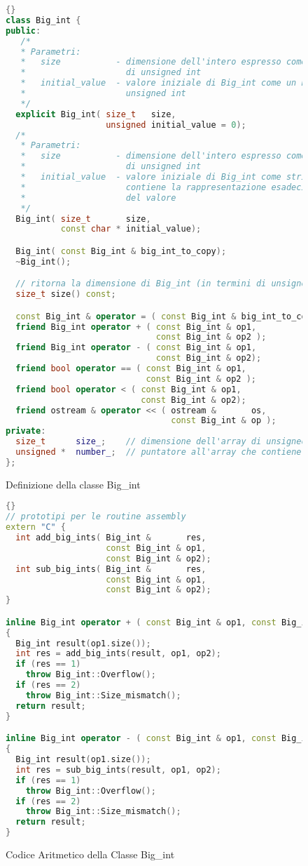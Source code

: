 \begin{figure}[tp]
\begin{lstlisting}[frame=tlrb,language=C++]{}
class Big_int {
public:
   /* 
   * Parametri:
   *   size           - dimensione dell'intero espresso come numero 
   *                    di unsigned int
   *   initial_value  - valore iniziale di Big_int come un normale 
   *                    unsigned int
   */
  explicit Big_int( size_t   size,
                    unsigned initial_value = 0);
  /*
   * Parametri:
   *   size           - dimensione dell'intero espresso come numero 
   *                    di unsigned int
   *   initial_value  - valore iniziale di Big_int come stringa che 
   *                    contiene la rappresentazione esadecimale 
   *                    del valore 
   */
  Big_int( size_t       size,
           const char * initial_value);

  Big_int( const Big_int & big_int_to_copy);
  ~Big_int();

  // ritorna la dimensione di Big_int (in termini di unsigned int)
  size_t size() const;

  const Big_int & operator = ( const Big_int & big_int_to_copy);
  friend Big_int operator + ( const Big_int & op1,
                              const Big_int & op2 );
  friend Big_int operator - ( const Big_int & op1,
                              const Big_int & op2);
  friend bool operator == ( const Big_int & op1,
                            const Big_int & op2 );
  friend bool operator < ( const Big_int & op1,
                           const Big_int & op2);
  friend ostream & operator << ( ostream &       os,
                                 const Big_int & op );
private:
  size_t      size_;    // dimensione dell'array di unsigned
  unsigned *  number_;  // puntatore all'array che contiene i valori
};
\end{lstlisting}
\caption{Definizione della classe Big\_int\label{fig:BigIntClass}}
\end{figure}

\begin{figure}[tp]
\begin{lstlisting}[frame=tlrb,language=C++]{}
// prototipi per le routine assembly
extern "C" {
  int add_big_ints( Big_int &       res, 
                    const Big_int & op1, 
                    const Big_int & op2);
  int sub_big_ints( Big_int &       res, 
                    const Big_int & op1, 
                    const Big_int & op2);
}

inline Big_int operator + ( const Big_int & op1, const Big_int & op2)
{
  Big_int result(op1.size());
  int res = add_big_ints(result, op1, op2);
  if (res == 1)
    throw Big_int::Overflow();
  if (res == 2)
    throw Big_int::Size_mismatch();
  return result;
}

inline Big_int operator - ( const Big_int & op1, const Big_int & op2)
{
  Big_int result(op1.size());
  int res = sub_big_ints(result, op1, op2);
  if (res == 1)
    throw Big_int::Overflow();
  if (res == 2)
    throw Big_int::Size_mismatch();
  return result;
}
\end{lstlisting}
\caption{Codice Aritmetico della Classe Big\_int\label{fig:BigIntAdd}}
\end{figure}

